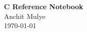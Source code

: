 \begin{titlepage}
    \thispagestyle{empty} %
    \centering
    \vfill     %

    \begin{center}
        \vspace*{2cm}   %
        {\Huge \textbf{C Reference Notebook}}\\
        \vspace{1cm}
        {\Large Anchit Mulye}\\
        \vspace{0.5cm}
        {\Large \today}
    \end{center}

    \vfill    %
\end{titlepage}